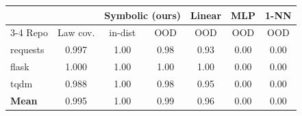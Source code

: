 \begin{tabular}{lcccccc}
\toprule
& & \multicolumn{2}{c}{Symbolic (ours)} & Linear & MLP & 1-NN \\
\cmidrule(lr){3-4}
Repo & Law cov. & in-dist & OOD & OOD & OOD & OOD \\
\midrule
requests & 0.997 & 1.00 & 0.98 & 0.93 & 0.00 & 0.00 \\
flask & 1.000 & 1.00 & 1.00 & 1.00 & 0.00 & 0.00 \\
tqdm & 0.988 & 1.00 & 0.98 & 0.95 & 0.00 & 0.00 \\
\midrule
\textbf{Mean} & 0.995 & 1.00 & 0.99 & 0.96 & 0.00 & 0.00 \\
\bottomrule
\end{tabular}
